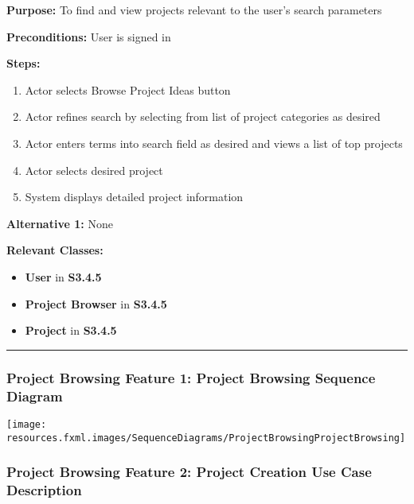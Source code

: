 \documentclass[twoside,letterpaper]{article}
\begin{document}
\noindent\textbf{Purpose:} To find and view projects relevant to the user's search parameters \newline

\noindent\textbf{Preconditions:} User is signed in \newline

\noindent\textbf{Steps:} \begin{enumerate}
	\item Actor selects Browse Project Ideas button
	\item Actor refines search by selecting from list of project categories as desired
	\item Actor enters terms into search field as desired and views a list of top projects
	\item Actor selects desired project
	\item System displays detailed project information
\end{enumerate}
\noindent\textbf{Alternative 1:} None \newline


\noindent\textbf{Relevant Classes:}
\begin{itemize}
	\item \textbf{User} in \textbf{S3.4.5}
	\item \textbf{Project Browser} in \textbf{S3.4.5}
	\item \textbf{Project} in \textbf{S3.4.5}
\end{itemize}
\vspace{8pt}
\hrule
\newpage
\subsubsection[Project Browsing Feature 1: Project Browsing Sequence Diagram]{\rmfamily\bfseries\color{black}
	Project Browsing Feature 1: Project Browsing Sequence Diagram}
\hypertarget{RefHeading22059017292}{}

\bigskip

\texttt{[image: resources.fxml.images/SequenceDiagrams/ProjectBrowsingProjectBrowsing]}
\label{pb:sd1}

\newpage
\subsubsection[Project Browsing Feature 2: Project Creation Use Case Description]{\rmfamily\bfseries\color{black}
Project Browsing Feature 2: Project Creation Use Case Description}
\hypertarget{RefHeading22059017292}{}
\end{document}
